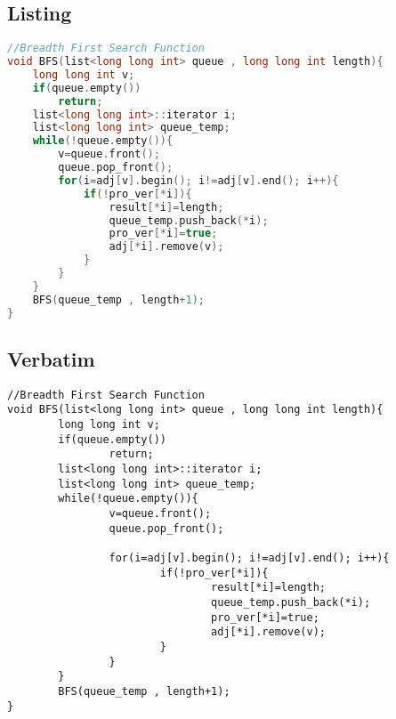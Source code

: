 \documentclass[titlepage]{article}
\begin{document}
\subsection{Listing}
\begin{lstlisting}[language=C++,frame=tb]
//Breadth First Search Function
void BFS(list<long long int> queue , long long int length){
    long long int v;
    if(queue.empty())
        return;
    list<long long int>::iterator i;
    list<long long int> queue_temp;
    while(!queue.empty()){
        v=queue.front();
        queue.pop_front();
        for(i=adj[v].begin(); i!=adj[v].end(); i++){
            if(!pro_ver[*i]){
                result[*i]=length;
                queue_temp.push_back(*i);
                pro_ver[*i]=true;
                adj[*i].remove(v);
            }
        }
    }
    BFS(queue_temp , length+1);
}
\end{lstlisting}

\newpage
\subsection{Verbatim}
\begin{verbatim}
//Breadth First Search Function
void BFS(list<long long int> queue , long long int length){
        long long int v;
        if(queue.empty())
                return;
        list<long long int>::iterator i;
        list<long long int> queue_temp;
        while(!queue.empty()){
                v=queue.front();
                queue.pop_front();
            
                for(i=adj[v].begin(); i!=adj[v].end(); i++){
                        if(!pro_ver[*i]){
                                result[*i]=length;
                                queue_temp.push_back(*i);
                                pro_ver[*i]=true;
                                adj[*i].remove(v);
                        }
                }
        }
        BFS(queue_temp , length+1);
}
\end{verbatim}

\newpage
\end{document}
